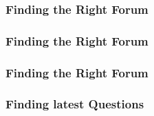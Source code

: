 \documentclass{beamer}
\begin{document}
    \begin{frame}
    \frametitle{Finding the Right Forum}
    
    \begin{center}
     
      
    \end{center}  
  \end{frame}
  \begin{frame}
    \frametitle{Finding the Right Forum}
    
    \begin{center}
     
      
    \end{center}  
  \end{frame}
  \begin{frame}
    \frametitle{Finding the Right Forum}
    
    \begin{center}
     
      
    \end{center}  
  \end{frame}
  \begin{frame}
    \frametitle{Finding latest Questions}
    
    \begin{center}
     
      
    \end{center}  
  \end{frame}
\end{document}
